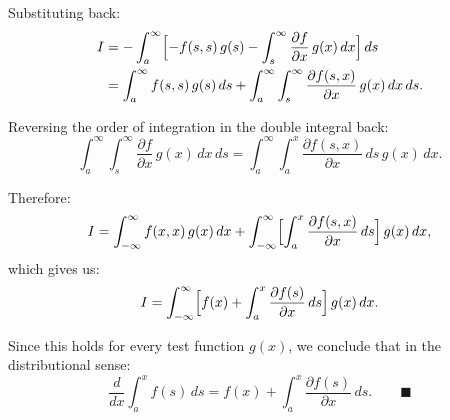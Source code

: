 \documentclass[12pt]{article}
\begin{document}
Substituting back:
\begin{align}
I &= -\int_a^{\infty}\Bigl[-f(s,s)\,g(s) - \int_s^{\infty}\frac{\partial f}{\partial x}\,g(x)\,dx\Bigr]\,ds \\
&= \int_a^{\infty} f(s,s)\,g(s)\,ds + \int_a^{\infty}\int_s^{\infty}\frac{\partial f(s,x)}{\partial x}\,g(x)\,dx\,ds.
\end{align}

Reversing the order of integration in the double integral back:
\[
\int_a^{\infty}\int_s^{\infty}\frac{\partial f}{\partial x}\,g(x)\,dx\,ds = \int_a^{\infty}\int_a^x \frac{\partial f(s,x)}{\partial x}\,ds\,g(x)\,dx.
\]

Therefore:
\[
I = \int_{-\infty}^{\infty} f(x,x)\,g(x)\,dx + \int_{-\infty}^{\infty}\Bigl[\int_a^x \frac{\partial f(s,x)}{\partial x}\,ds\Bigr]\,g(x)\,dx,
\]
which gives us:
\[
I = \int_{-\infty}^{\infty}\Bigl[f(x) + \int_a^x \frac{\partial f(s)}{\partial x}\,ds\Bigr]\,g(x)\,dx.
\]

Since this holds for every test function $g(x)$, we conclude that in the distributional sense:
\[
\frac{d}{dx}\int_a^x f(s)\,ds = f(x) + \int_a^x \frac{\partial f(s)}{\partial x}\,ds. \qquad \blacksquare
\]
\end{document}
